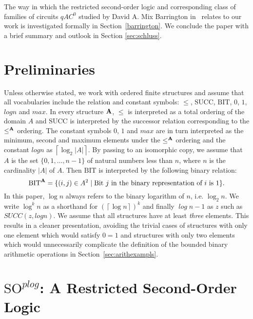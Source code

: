 \documentclass{article}
\begin{document}
The way in which the restricted second-order logic and corresponding class of families of circuits $\mathit{qAC}^0$ studied by David A. Mix Barrington in~\cite{Barr92} relates to our work is investigated formally in Section~\ref{barrington}. We conclude the paper with a brief summary and outlook in Section \ref{sec:schluss}.










 
\section{Preliminaries}\label{sec:preliminaries}

Unless otherwise stated, we work with ordered finite structures and assume that all vocabularies include the relation and constant symbols: $\leq$, $\mathrm{SUCC}$, $\mathrm{BIT}$, $0$, $1$, $\mathit{logn}$ and $\mathit{max}$. In every structure $\bf A$, $\leq$ is interpreted as a total ordering of the domain $A$ and $\mathrm{SUCC}$ is interpreted by the successor relation corresponding to the $\leq^{\bf A}$ ordering. The constant symbols $0$, $1$ and $\mathit{max}$ are in turn interpreted as the minimum, second and maximum elements under the $\leq^{\bf A}$ ordering and the constant $\mathit{logn}$ as $\left\lceil \log_2 |A| \right\rceil$. By passing to an isomorphic copy, we assume that $A$ is the set $\{0, 1, \ldots, n-1\}$ of natural numbers less than $n$, where $n$ is the cardinality $|A|$ of $A$. Then $\mathrm{BIT}$ is interpreted by the following binary relation:
\[\mathrm{BIT}^{\bf A} = \{(i, j) \in A^2 \mid \text{Bit $j$ in the binary representation of $i$ is $1$}\}.\]
In this paper, $\log n$ always refers to the binary logarithm of $n$, i.e. $\log_2 n$. We write $\log^k n$ as a shorthand for $(\left\lceil\log n \right\rceil)^k$ and finally $\mathit{\log n-1}$ as $z$ such as $SUCC(z,\mathit{logn})$. 
We assume that all structures have at least \emph{three} elements. This results in a cleaner presentation, avoiding the trivial cases of structures with only one element which would satisfy $0 = 1$ and structures with only two elements which would unnecessarily complicate the definition of the bounded binary arithmetic operations in Section~\ref{sec:arithexampls}.   


 
\section{\texorpdfstring{$\mathrm{SO}^{\mathit{plog}}$}{TEXT}: A Restricted Second-Order Logic}{\label{sec:soplog}}
\end{document}
